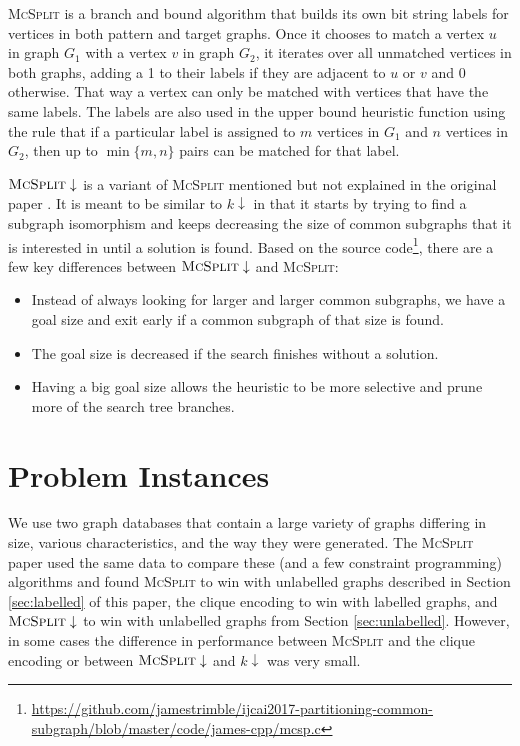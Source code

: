 \documentclass{l4proj}
\theoremstyle{definition}
\theoremstyle{remark}
\begin{document}
\textsc{McSplit} \cite{DBLP:conf/ijcai/McCreeshPT17} is a branch and bound
algorithm that builds its own bit string labels for vertices in both pattern and
target graphs. Once it chooses to match a vertex $u$ in graph $G_1$ with a
vertex $v$ in graph $G_2$, it iterates over all unmatched vertices in both
graphs, adding a 1 to their labels if they are adjacent to $u$ or $v$ and 0
otherwise. That way a vertex can only be matched with vertices that have the
same labels. The labels are also used in the upper bound heuristic function
using the rule that if a particular label is assigned to $m$ vertices in $G_1$
and $n$ vertices in $G_2$, then up to $\min \{ m, n \}$ pairs can be matched for
that label.

$\textsc{McSplit} \downarrow$ is a variant of \textsc{McSplit} mentioned but not
explained in the original paper \cite{DBLP:conf/ijcai/McCreeshPT17}. It is meant
to be similar to $k\downarrow$ in that it starts by trying to find a subgraph
isomorphism and keeps decreasing the size of common subgraphs that it is
interested in until a solution is found. Based on the source
code\footnote{\url{https://github.com/jamestrimble/ijcai2017-partitioning-common-subgraph/blob/master/code/james-cpp/mcsp.c}},
there are a few key differences between $\textsc{McSplit} \downarrow$ and
\textsc{McSplit}:
\begin{itemize}
\item Instead of always looking for larger and larger common subgraphs, we have
  a goal size and exit early if a common subgraph of that size is found.
\item The goal size is decreased if the search finishes without a solution.
\item Having a big goal size allows the heuristic to be more selective and prune
  more of the search tree branches.
\end{itemize}

\chapter{Problem Instances} \label{chapter:problems}
We use two graph databases that contain a large variety of graphs differing in
size, various characteristics, and the way they were generated. The
\textsc{McSplit} paper \cite{DBLP:conf/ijcai/McCreeshPT17} used the same
data to compare these (and a few constraint programming) algorithms and
found \textsc{McSplit} to win with unlabelled graphs described in Section
\ref{sec:labelled} of this paper, the clique encoding to win with labelled
graphs, and $\textsc{McSplit}\downarrow$ to win with unlabelled graphs from
Section \ref{sec:unlabelled}. However, in some cases the difference in
performance between \textsc{McSplit} and the clique encoding or between
$\textsc{McSplit}\downarrow$ and $k\downarrow$ was very small.
\end{document}
